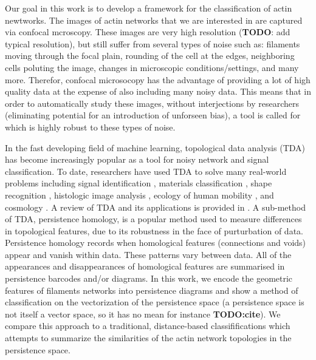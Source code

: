 \documentclass[10pt]{article}
\begin{document}
Our goal in this work is to develop a framework for the classification of actin newtworks. The images of actin networks that we are interested in are captured via confocal mcroscopy. These images are very high resolution (\textbf{TODO}: add typical resolution), but still suffer from several types of noise such as: filaments moving through the focal plain, rounding of the cell at the edges, neighboring cells poluting the image, changes in microscopic conditions/settings, and many more. Therefor, confocal microsocopy has the advantage of providing a lot of high quality data at the expense of also including many noisy data. This means that in order to automatically study these images, without interjections by researchers (eliminating potential for an introduction of unforseen bias), a tool is called for which is highly robust to these types of noise.

In the fast developing field of machine learning, topological data analysis (TDA) has become increasingly popular as a tool for noisy network and signal classification. To date, researchers have used TDA to solve many real-world problems including signal identification \cite{marchese2016topological}, materials classification \cite{hiraoka2016hierarchical,maroulas2019bayesian}, shape recognition \cite{bonis2016persistence,li2014persistence}, histologic image analysis \cite{belchi2018lung,nicolau2011topology,singh2014topological}, ecology of human mobility \cite{chen2017measuring,chen2019generalized}, and cosmology \cite{sousbie2011persistent,van2010alpha}. A review of TDA and its applications is provided in \cite{wasserman2018topological}. A sub-method of TDA, persistence homology, is a popular method used to measure differences in topological features, due to its robustness in the face of purturbation of data. Persistence homology records when homological features (connections and voids) appear and vanish within data. These patterns vary between data. All of the appearances and disappearances of homological features are summarised in persistence barcodes and/or diagrams. In this work, we encode the geometric features of filaments networks into persistence diagrams and show a method of classification on the vectorization of the persistence space (a persistence space is not itself a vector space, so it has no mean for instance \textbf{TODO:cite}). We compare this approach to a traditional, distance-based classififications which attempts to summarize the similarities of the actin network topologies in the persistence space.
\end{document}
